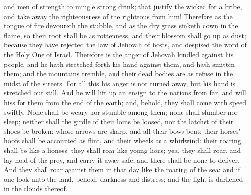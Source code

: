 and men of strength to mingle strong drink; that justify the wicked for a bribe, and take away the righteousness of the righteous from him!  Therefore as the tongue of fire devoureth the stubble, and as the dry grass sinketh down in the flame, so their root shall be as rottenness, and their blossom shall go up as dust; because they have rejected the law of Jehovah of hosts, and despised the word of the Holy One of Israel. Therefore is the anger of Jehovah kindled against his people, and he hath stretched forth his hand against them, and hath smitten them; and the mountains tremble, and their dead bodies are as refuse in the midst of the streets. For all this his anger is not turned away, but his hand is stretched out still.  And he will lift up an ensign to the nations from far, and will hiss for them from the end of the earth; and, behold, they shall come with speed swiftly. None shall be weary nor stumble among them; none shall slumber nor sleep; neither shall the girdle of their loins be loosed, nor the latchet of their shoes be broken: whose arrows are sharp, and all their bows bent; their horses’ hoofs shall be accounted as flint, and their wheels as a whirlwind: their roaring shall be like a lioness, they shall roar like young lions; yea, they shall roar, and lay hold of the prey, and carry it away safe, and there shall be none to deliver. And they shall roar against them in that day like the roaring of the sea: and if one look unto the land, behold, darkness and distress; and the light is darkened in the clouds thereof. 

